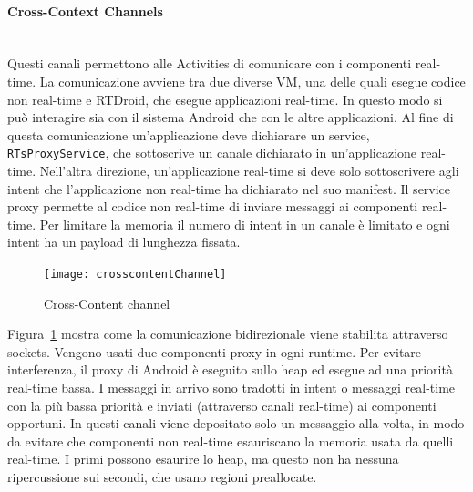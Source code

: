 \paragraph{Cross-Context Channels} \mbox{} \\
Questi canali permettono alle Activities di comunicare con i componenti real-time. La comunicazione avviene tra due diverse VM, una delle quali esegue codice non real-time e RTDroid, che esegue applicazioni real-time. In questo modo si può interagire sia con il sistema Android che con le altre applicazioni. Al fine di questa comunicazione un'applicazione deve dichiarare un service, \texttt{RTsProxyService}, che sottoscrive un canale dichiarato in un'applicazione real-time. Nell'altra direzione, un'applicazione real-time si deve solo sottoscrivere agli intent che l'applicazione non real-time ha dichiarato nel suo manifest. Il service proxy permette al codice non real-time di inviare messaggi ai componenti real-time. Per limitare la memoria il numero di intent in un canale è limitato e ogni intent ha un payload di lunghezza fissata.
\begin{figure}[h]
	\centering
	\texttt{[image: crosscontentChannel]}
	\caption{Cross-Content channel}
	\label{fig:crosscontentchannel}
\end{figure}

Figura~\ref{fig:crosscontentchannel} mostra come la comunicazione bidirezionale viene stabilita attraverso sockets. Vengono usati due componenti proxy in ogni runtime. Per evitare interferenza, il proxy di Android è eseguito sullo heap ed esegue ad una priorità real-time bassa. I messaggi in arrivo sono tradotti in intent o messaggi real-time con la più bassa priorità e inviati (attraverso canali real-time) ai componenti opportuni. In questi canali viene depositato solo un messaggio alla volta, in modo da evitare che componenti non real-time esauriscano la memoria usata da quelli real-time. I primi possono esaurire lo heap, ma questo non ha nessuna ripercussione sui secondi, che usano regioni preallocate.

